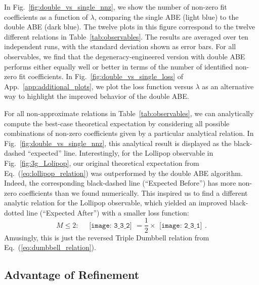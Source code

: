 \documentclass[aps,prd,twocolumn, superscriptaddress,preprintnumbers, nofootinbib,longbibliography,floatfix]{revtex4-2}
\DeclareRobustCommand{\App}[1]{App.~\ref{#1}}
\DeclareRobustCommand{\Tab}[1]{Table~\ref{#1}}
\DeclareRobustCommand{\Fig}[1]{Fig.~\ref{#1}}
\DeclareRobustCommand{\Eq}[1]{Eq.~(\ref{#1})}
\begin{document}
In \Fig{fig:double_vs_single_nnz}, we show the number of non-zero fit coefficients as a function of $\lambda$, comparing the single ABE (light blue) to the double ABE (dark blue).
%
The twelve plots in this figure correspond to the twelve different relations in \Tab{tab:observables}.
%
The results are averaged over ten independent runs, with the standard deviation shown as error bars.
%
For all observables, we find that the degeneracy-engineered version with double ABE performs either equally well or better in terms of the number of identified non-zero fit coefficients.
%
In \Fig{fig:double_vs_single_loss} of \App{app:additional_plots}, we plot the loss function versus $\lambda$ as an alternative way to highlight the improved behavior of the double ABE.


For all non-approximate relations in \Tab{tab:observables}, we can analytically compute the best-case theoretical expectation by considering all possible combinations of non-zero coefficients given by a particular analytical relation.
%
In \Fig{fig:double_vs_single_nnz}, this analytical result is displayed as the black-dashed ``expected'' line. 
%
Interestingly, for the Lollipop observable in \Fig{fig:3g_Lolipop}, our original theoretical expectation from \Eq{eq:lollipop_relation} was outperformed by the double ABE algorithm.
%
Indeed, the corresponding black-dashed line (``Expected Before'') has more non-zero coefficients than we found numerically.
%
This inspired us to find a different analytic relation for the Lollipop observable, which yielded an improved black-dotted line (``Expected After'') with a smaller loss function:
%
\begin{equation}
M \leq 2: \quad
\begin{gathered}
\texttt{[image: 3\_3\_2]}
\end{gathered}
= \frac{1}{2} \times
\begin{gathered}
\texttt{[image: 2\_3\_1]}
\end{gathered}.
\label{eq:new_relation}
\end{equation}
%
Amusingly, this is just the reversed Triple Dumbbell relation from \Eq{eq:dumbbell_relation}.


\subsection{Advantage of Refinement}
\label{sec:l0_norm_refinement}
\end{document}
